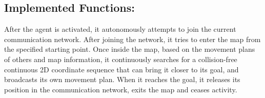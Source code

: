 \subsection{Implemented Functions:}

After the agent is activated, it autonomously attempts to join the current communication network. 
After joining the network, it tries to enter the map from the specified starting point. 
Once inside the map, based on the movement plans of others and map information, it continuously searches for a collision-free continuous 2D coordinate sequence that can bring it closer to its goal, and broadcasts its own movement plan. 
When it reaches the goal, it releases its position in the communication network, exits the map and ceases activity.







